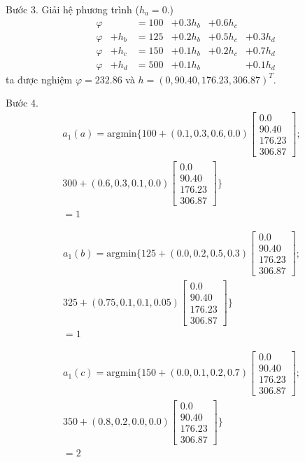 \documentclass[12pt,a4paper]{report}
\begin{document}
\medskip
\noindent
Bước 3. 
Giải hệ phương trình ($h_a=0$.)
\begin{align*}
&\varphi&&=100&+0.3h_b&+0.6h_c\\
&\varphi &+h_b&=125&+0.2h_b&+0.5h_c&+0.3h_d\\
&\varphi &+h_c&=150&+0.1h_b&+0.2h_c&+0.7h_d\\
&\varphi &+h_d&=500&+0.1h_b&&+0.1h_d
\end{align*}
ta được nghiệm $\varphi=232.86$ và $h=(0, 90.40, 176.23, 306.87)^T$.

\medskip
\noindent
Bước 4. 
\begin{align*}
a_1(a)=\mathrm{argmin}\{100+(0.1,0.3, 0.6,0.0)
\left[
\begin{array}{c}
0.0\\
90.40\\
176.23\\
306.87
\end{array}
\right];\\
300+(0.6,0.3,0.1,0.0)
\left[
\begin{array}{c}
0.0\\
90.40\\
176.23\\
306.87
\end{array}
\right]\}\\
=1
\end{align*}

\begin{align*}
a_1(b)=\mathrm{argmin}\{125+(0.0,0.2, 0.5,0.3)
\left[
\begin{array}{c}
0.0\\
90.40\\
176.23\\
306.87
\end{array}
\right];\\
325+(0.75,0.1,0.1,0.05)
\left[
\begin{array}{c}
0.0\\
90.40\\
176.23\\
306.87
\end{array}
\right]\}\\
=1
\end{align*}

\begin{align*}
a_1(c)=\mathrm{argmin}\{150+(0.0,0.1, 0.2,0.7)
\left[
\begin{array}{c}
0.0\\
90.40\\
176.23\\
306.87
\end{array}
\right];\\
350+(0.8,0.2,0.0,0.0)
\left[
\begin{array}{c}
0.0\\
90.40\\
176.23\\
306.87
\end{array}
\right]\}\\
=2
\end{align*}
\end{document}
